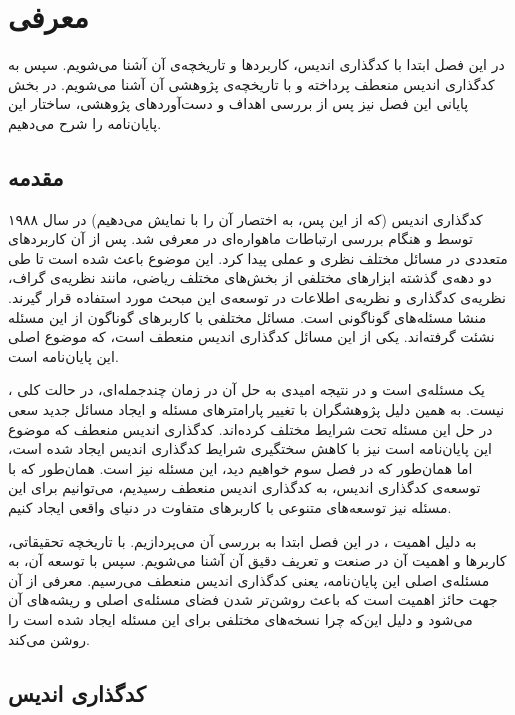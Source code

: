 \chapter{معرفی}
\label{chapter:introduction}
 در این فصل ابتدا با کدگذاری اندیس، کاربردها و تاریخچه‌ی آن آشنا می‌شویم. سپس به کدگذاری اندیس منعطف پرداخته و با تاریخچه‌ی پژوهشی آن آشنا می‌شویم. در بخش پایانی این فصل نیز پس از بررسی اهداف و دست‌آوردهای پژوهشی، ساختار این پایان‌نامه را شرح می‌دهیم.
\pagebreak

\section{مقدمه}
کدگذاری اندیس (که از این پس، به اختصار آن را با
\icod
نمایش می‌دهیم) در سال ۱۹۸۸ توسط 
و
هنگام بررسی ارتباطات ماهواره‌ای در
\cite{25}
معرفی شد. پس از آن \icod کاربردهای متعددی در مسائل مختلف نظری و عملی پیدا کرد. این موضوع باعث شده است تا طی دو دهه‌ی گذشته ابزارهای مختلفی از بخش‌های مختلف ریاضی، مانند نظریه‌ی گراف، نظریه‌ی کدگذاری و نظریه‌ی اطلاعات در توسعه‌ی این مبحث مورد استفاده قرار گیرند. \icod منشا مسئله‌های گوناگونی است. مسائل مختلفی با کاربرهای گوناگون از این مسئله نشئت گرفته‌اند. یکی از این مسائل کدگذاری اندیس منعطف است، که موضوع اصلی این پایان‌نامه است.

	\icod، یک مسئله‌ی
است و در نتیجه امیدی به حل آن در زمان چندجمله‌ای، در حالت کلی نیست. به همین دلیل پژوهشگران با تغییر پارامترهای مسئله و ایجاد مسائل جدید سعی در حل این مسئله تحت شرایط مختلف کرده‌اند. کدگذاری اندیس منعطف که موضوع این پایان‌نامه است نیز با کاهش سختگیری شرایط کدگذاری اندیس ایجاد شده است، اما همان‌طور که در فصل سوم خواهیم دید، این مسئله نیز
\nphard
است. همان‌طور که با توسعه‌ی کدگذاری اندیس، به کدگذاری اندیس منعطف رسیدیم، می‌توانیم برای  این مسئله نیز توسعه‌های متنوعی با کاربرهای متفاوت در دنیای واقعی ایجاد کنیم.

به دلیل اهمیت \icod، در این فصل ابتدا به بررسی آن می‌پردازیم. با تاریخچه تحقیقاتی، کاربرها و اهمیت آن در صنعت و تعریف دقیق آن آشنا می‌شویم. سپس با توسعه آن، به مسئله‌ی اصلی این پایان‌نامه، یعنی کدگذاری اندیس منعطف می‌رسیم. معرفی \icod از آن جهت حائز اهمیت است که باعث روشن‌تر شدن فضای مسئله‌‌ی اصلی و ریشه‌های آن می‌شود و دلیل این‌که چرا نسخه‌های مختلفی برای این مسئله ایجاد شده است را روشن می‌کند.
\pagebreak
\section{کدگذاری اندیس}
